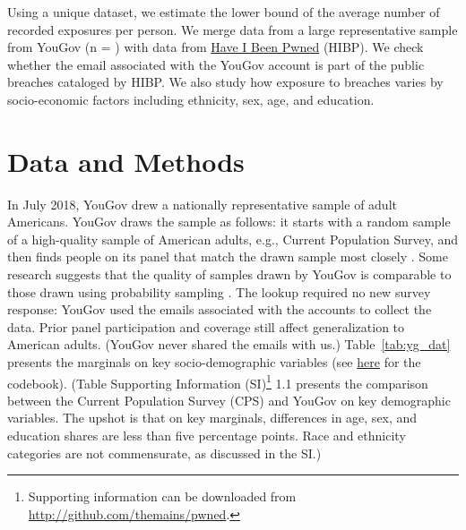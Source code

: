 \documentclass[sigconf]{acmart}
\begin{document}
Using a unique dataset, we estimate the lower bound of the average number of recorded exposures per person. We merge data from a large representative sample from YouGov (n = \sampleSize{}) with data from \href{https://haveibeenpwned.com}{Have I Been Pwned} (HIBP). We check whether the email associated with the YouGov account is part of the \catalogCount{} public breaches cataloged by HIBP. We also study how exposure to breaches varies by socio-economic factors including ethnicity, sex, age, and education.

\section{Data and Methods}
In July 2018, YouGov drew a nationally representative sample of \sampleSize{} adult Americans. YouGov draws the sample as follows: it starts with a random sample of a high-quality sample of American adults, e.g., Current Population Survey, and then finds people on its panel that match the drawn sample most closely \cite{rivers}. Some research suggests that the quality of samples drawn by YouGov is comparable to those drawn using probability sampling \cite{ansolabehere}. The lookup required no new survey response: YouGov used the emails associated with the accounts to collect the data. Prior panel participation and coverage still affect generalization to American adults. (YouGov never shared the emails with us.) Table~\ref{tab:yg_dat} presents the marginals on key socio-demographic variables (see \href{https://github.com/themains/pwned/tree/master/data}{here} for the codebook). (Table Supporting Information (SI)\footnote{Supporting information can be downloaded from \url{http://github.com/themains/pwned}.} 1.1 presents the comparison between the Current Population Survey (CPS) and YouGov on key demographic variables. The upshot is that on key marginals, differences in age, sex, and education shares are less than five percentage points. Race and ethnicity categories are not commensurate, as discussed in the SI.)


\end{document}
